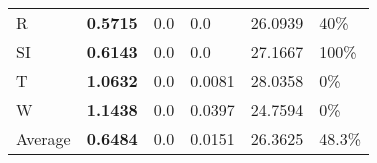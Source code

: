 \documentclass[11pt, a4paper]{article}
\begin{document}
\begin{table}[H]
\begin{tabular}{llllll}
R                                & \textbf{0.5715}                   & 0.0                               & 0.0                                  & 26.0939                                     & 40\%                              \\
SI                        & \textbf{0.6143}                   & 0.0                               & 0.0                                  & 27.1667                                     & 100\%                             \\
T                              & \textbf{1.0632}                   & 0.0                               & 0.0081                               & 28.0358                                     & 0\%                               \\
W                             & \textbf{1.1438}                   & 0.0                               & 0.0397                               & 24.7594                                     & 0\%                               \\ \hline
Average                               & \textbf{0.6484}                   & 0.0                               & 0.0151                               & 26.3625                                     & 48.3\%
\end{tabular}
\end{table}
\end{document}
